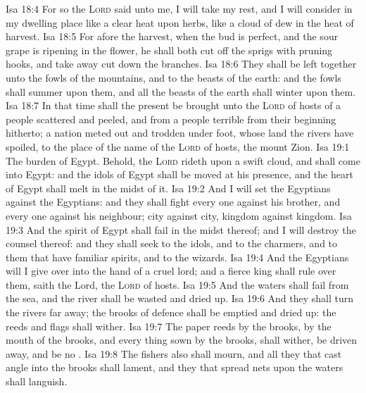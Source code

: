 \vs Isa 18:4 For so the \textsc{Lord} said unto me, I will take my rest, and I will consider in my dwelling place like a clear heat upon herbs,  like a cloud of dew in the heat of harvest.
\vs Isa 18:5 For afore the harvest, when the bud is perfect, and the sour grape is ripening in the flower, he shall both cut off the sprigs with pruning hooks, and take away  cut down the branches.
\vs Isa 18:6 They shall be left together unto the fowls of the mountains, and to the beasts of the earth: and the fowls shall summer upon them, and all the beasts of the earth shall winter upon them.
\vs Isa 18:7 In that time shall the present be brought unto the \textsc{Lord} of hosts of a people scattered and peeled, and from a people terrible from their beginning hitherto; a nation meted out and trodden under foot, whose land the rivers have spoiled, to the place of the name of the \textsc{Lord} of hosts, the mount Zion.
\vs Isa 19:1 The burden of Egypt. Behold, the \textsc{Lord} rideth upon a swift cloud, and shall come into Egypt: and the idols of Egypt shall be moved at his presence, and the heart of Egypt shall melt in the midst of it.
\vs Isa 19:2 And I will set the Egyptians against the Egyptians: and they shall fight every one against his brother, and every one against his neighbour; city against city,  kingdom against kingdom.
\vs Isa 19:3 And the spirit of Egypt shall fail in the midst thereof; and I will destroy the counsel thereof: and they shall seek to the idols, and to the charmers, and to them that have familiar spirits, and to the wizards.
\vs Isa 19:4 And the Egyptians will I give over into the hand of a cruel lord; and a fierce king shall rule over them, saith the Lord, the \textsc{Lord} of hosts.
\vs Isa 19:5 And the waters shall fail from the sea, and the river shall be wasted and dried up.
\vs Isa 19:6 And they shall turn the rivers far away;  the brooks of defence shall be emptied and dried up: the reeds and flags shall wither.
\vs Isa 19:7 The paper reeds by the brooks, by the mouth of the brooks, and every thing sown by the brooks, shall wither, be driven away, and be no .
\vs Isa 19:8 The fishers also shall mourn, and all they that cast angle into the brooks shall lament, and they that spread nets upon the waters shall languish.

